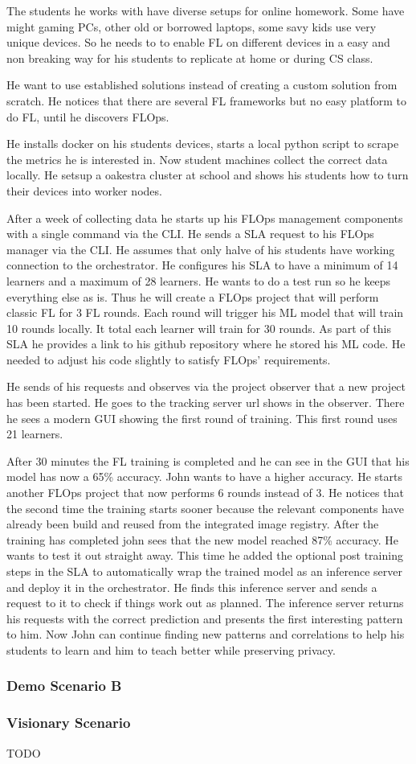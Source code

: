 The students he works with have diverse setups for online homework.
Some have might gaming PCs, other old or borrowed laptops, some savy kids use very unique devices.
So he needs to to enable FL on different devices in a easy and non breaking way for his students to replicate at home or during CS class.

He want to use established solutions instead of creating a custom solution from scratch.
He notices that there are several FL frameworks but no easy platform to do FL, until he discovers FLOps.

He installs docker on his students devices, starts a local python script to scrape the metrics he is interested in.
Now student machines collect the correct data locally.
He setsup a oakestra cluster at school and shows his students how to turn their devices into worker nodes.

After a week of collecting data he starts up his FLOps management components with a single command via the CLI.
He sends a SLA request to his FLOps manager via the CLI.
He assumes that only halve of his students have working connection to the orchestrator.
He configures his SLA to have a minimum of 14 learners and a maximum of 28 learners.
He wants to do a test run so he keeps everything else as is.
Thus he will create a FLOps project that will perform classic FL for 3 FL rounds.
Each round will trigger his ML model that will train 10 rounds locally.
It total each learner will train for 30 rounds.
As part of this SLA he provides a link to his github repository where he stored his ML code.
He needed to adjust his code slightly to satisfy FLOps' requirements.

He sends of his requests and observes via the project observer that a new project has been started.
He goes to the tracking server url shows in the observer.
There he sees a modern GUI showing the first round of training.
This first round uses 21 learners.

After 30 minutes the FL training is completed and he can see in the GUI that his model has now a 65\% accuracy.
John wants to have a higher accuracy.
He starts another FLOps project that now performs 6 rounds instead of 3.
He notices that the second time the training starts sooner because the relevant components have already been build and reused from the integrated image registry.
After the training has completed john sees that the new model reached 87\% accuracy.
He wants to test it out straight away.
This time he added the optional post training steps in the SLA to automatically wrap the trained model as an inference server and deploy it in the orchestrator.
He finds this inference server and sends a request to it to check if things work out as planned.
The inference server returns his requests with the correct prediction and presents the first interesting pattern to him.
Now John can continue finding new patterns and correlations to help his students to learn and him to teach better while preserving privacy.




\subsubsection{Demo Scenario B}

\subsubsection{Visionary Scenario}
TODO
